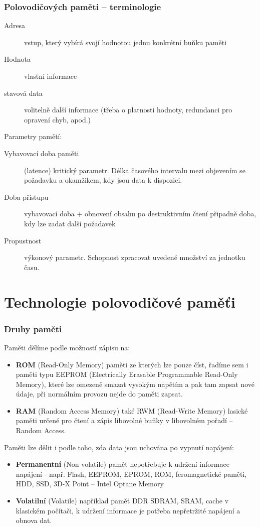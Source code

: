 \documentclass{beamer}
\begin{document}
\begin{frame}
\frametitle{Polovodičových paměti -- terminologie}

\begin{description}
 \item[Adresa] vstup, který vybírá svojí hodnotou jednu konkrétní buňku paměti
 \item[Hodnota] vlastní informace
 \item[stavová data] volitelně další informace (třeba o platnosti hodnoty, redundanci pro opravení chyb, apod.)
\end{description}

Parametry pamětí:

\begin{description}
  \item[Vybavovací doba paměti] (latence) kritický parametr. Délka časového intervalu mezi objevením se požadavku a okamžikem, kdy jsou data k dispozici.
  \item[Doba přístupu] vybavovací doba + obnovení obsahu po destruktivním čtení připadně doba, kdy lze zadat další požadavek
  \item[Propustnost] výkonový parametr. Schopnost zpracovat uvedené množství za jednotku času.
\end{description}

\end{frame}

\section{Technologie polovodičové paměťi}

\begin{frame}
\frametitle{Druhy paměti}

Paměti dělíme podle možností zápisu na:
\begin{itemize}
\item \textbf{ROM} (Read-Only Memory) paměti ze kterých lze pouze číst, řadíme sem i paměti typu EEPROM (Electrically Erasable Programmable Read-Only Memory), které lze omezeně smazat vysokým napětím a pak tam zapsat nové údaje, při normálním provozu nejde do paměti zapsat.
\item \textbf{RAM} (Random Access Memory) také RWM (Read-Write Memory) lasické paměti určené pro čtení a zápis libovolné buňky v libovolném pořadí -- Random Access.
\end{itemize}

Paměti lze dělit i podle toho, zda data jsou uchována po vypnutí napájení:
\begin{itemize}
\item \textbf{Permanentní} (Non-volatile) paměť nepotřebuje k udržení informace napájení - např. Flash, EEPROM, EPROM, ROM, feromagnetické paměti, HDD, SSD, 3D-X Point -- Intel Optane Memory
\item \textbf{Volatilní} (Volatile) například paměť DDR SDRAM, SRAM, cache v klasickém počítači, k udržení informace je potřeba nepřetržité napájení a obnova dat.
\end{itemize}
\end{frame}
\end{document}
